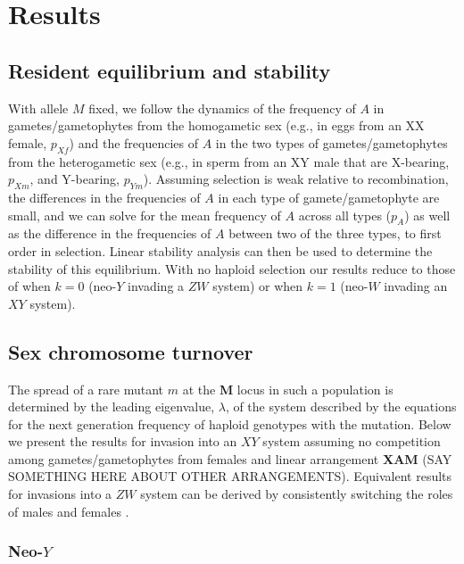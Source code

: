 \documentclass[12pt]{article}
\begin{document}
\section*{Results}

\subsection*{Resident equilibrium and stability}
With allele $M$ fixed, we follow the dynamics of the frequency of $A$ in gametes/gametophytes from the homogametic sex (e.g., in eggs from an XX female, $p_{Xf}$) and the frequencies of $A$ in the two types of gametes/gametophytes from the heterogametic sex (e.g., in sperm from an XY male that are X-bearing, $p_{Xm}$, and Y-bearing, $p_{Ym}$).
Assuming selection is weak relative to recombination, the differences in the frequencies of $A$ in each type of gamete/gametophyte are small, and we can solve for the mean frequency of $A$ across all types ($p_A$) as well as the difference in the frequencies of $A$ between two of the three types, to first order in selection.
Linear stability analysis can then be used to determine the stability of this equilibrium.
With no haploid selection our results reduce to those of \cite{vanDoorn:2010hu} when $k=0$ (neo-$Y$ invading a $ZW$ system) or when $k=1$ (neo-$W$ invading an $XY$ system).

\subsection*{Sex chromosome turnover}
The spread of a rare mutant $m$ at the \textbf{M} locus in such a population is determined by the leading eigenvalue, $\lambda$, of the system described by the equations for the next generation frequency of haploid genotypes with the mutation. %
Below we present the results for invasion into an $XY$ system assuming no competition among gametes/gametophytes from females and linear arrangement \textbf{X}\textbf{A}\textbf{M} (SAY SOMETHING HERE ABOUT OTHER ARRANGEMENTS). %
Equivalent results for invasions into a $ZW$ system can be derived by consistently switching the roles of males and females \citep{vanDoorn:2010hu}.

\subsubsection*{Neo-$Y$}
\end{document}
